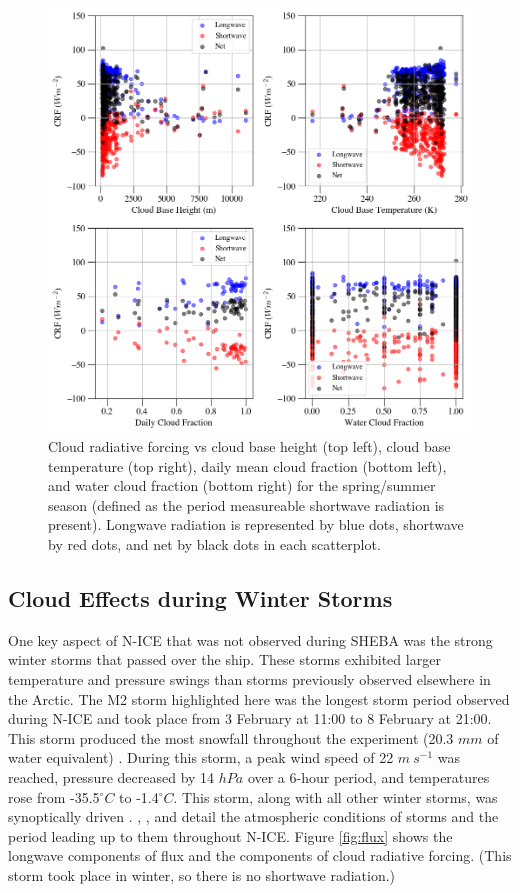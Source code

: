 \begin{figure}[h]
    \centering
    \includegraphics[width=1\linewidth]{figures/chapter4/VSSummer.png}
    \caption[Cloud radiative forcing vs cloud base height, cloud base temperature, cloud fraction, and water cloud fraction for summer.]{Cloud radiative forcing vs cloud base height (top left), cloud base temperature (top right), daily mean cloud fraction (bottom left), and water cloud fraction (bottom right) for the spring/summer season (defined as the period measureable shortwave radiation is present). Longwave radiation is represented by blue dots, shortwave by red dots, and net by black dots in each scatterplot.}
    \label{fig:spring:crf}
\end{figure}

\subsection{Cloud Effects during Winter Storms}
One key aspect of N-ICE that was not observed during SHEBA was the strong winter storms that passed over the ship. These storms exhibited larger temperature and pressure swings than storms previously observed elsewhere in the Arctic. The M2 storm highlighted here was the longest storm period observed during N-ICE and took place from 3 February at 11:00 to 8 February at 21:00. This storm produced the most snowfall throughout the experiment (20.3 $mm$ of water equivalent) \citep{cohen:2017}. During this storm, a peak wind speed of 22 $m~s^{-1}$ was reached, pressure decreased by 14 $hPa$ over a 6-hour period, and temperatures rose from -35.5$^{\circ}C$ to -1.4$^{\circ}C$. This storm, along with all other winter storms, was synoptically driven \citep{cohen:2017}. \citet{cohen:2017}, \citet{walden:2017}, and \citet{kayser:2017} detail the atmospheric conditions of storms and the period leading up to them throughout N-ICE. Figure \ref{fig:flux} shows the longwave components of flux and the components of cloud radiative forcing. (This storm took place in winter, so there is no shortwave radiation.)

